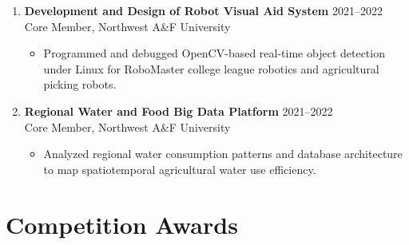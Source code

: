\documentclass[10pt,a4paper]{article}
\begin{document}
\begin{enumerate}[leftmargin=22pt]
    \item \textbf{Development and Design of Robot Visual Aid System} \hfill 2021--2022\\
    Core Member, Northwest A\&F University
    \begin{itemize}
        \item Programmed and debugged OpenCV-based real-time object detection under Linux for RoboMaster college league robotics and agricultural picking robots.
    \end{itemize}

    \item \textbf{Regional Water and Food Big Data Platform} \hfill 2021--2022\\
    Core Member, Northwest A\&F University
    \begin{itemize}
        \item Analyzed regional water consumption patterns and database architecture to map spatiotemporal agricultural water use efficiency.
    \end{itemize}
\end{enumerate}

\section{Competition Awards}
\end{document}

